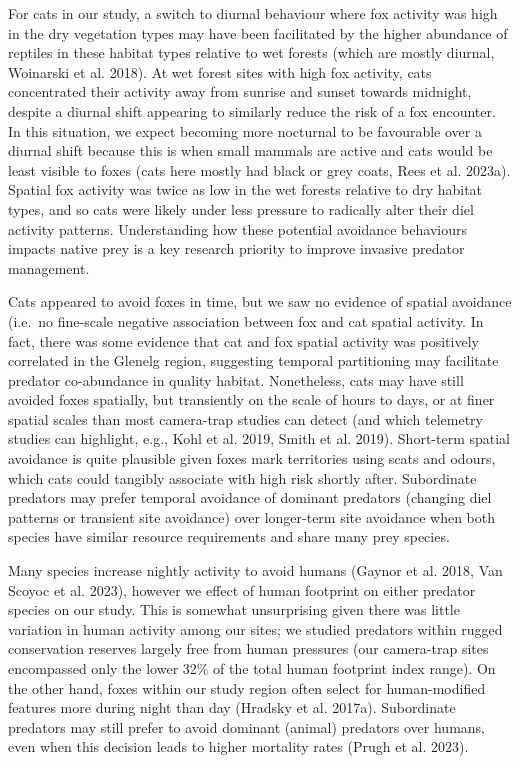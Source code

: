 \documentclass[preprint, 3p, authoryear]{elsarticle} %
\begin{document}
For cats in our study, a switch to diurnal behaviour where fox activity was high in the dry vegetation types may have been facilitated by the higher abundance of reptiles in these habitat types relative to wet forests (which are mostly diurnal, Woinarski et al. 2018). At wet forest sites with high fox activity, cats concentrated their activity away from sunrise and sunset towards midnight, despite a diurnal shift appearing to similarly reduce the risk of a fox encounter. In this situation, we expect becoming more nocturnal to be favourable over a diurnal shift because this is when small mammals are active and cats would be least visible to foxes (cats here mostly had black or grey coats, Rees et al. 2023a). Spatial fox activity was twice as low in the wet forests relative to dry habitat types, and so cats were likely under less pressure to radically alter their diel activity patterns. Understanding how these potential avoidance behaviours impacts native prey is a key research priority to improve invasive predator management.

Cats appeared to avoid foxes in time, but we saw no evidence of spatial avoidance (i.e.~no fine-scale negative association between fox and cat spatial activity. In fact, there was some evidence that cat and fox spatial activity was positively correlated in the Glenelg region, suggesting temporal partitioning may facilitate predator co-abundance in quality habitat. Nonetheless, cats may have still avoided foxes spatially, but transiently on the scale of hours to days, or at finer spatial scales than most camera-trap studies can detect (and which telemetry studies can highlight, e.g., Kohl et al. 2019, Smith et al. 2019). Short-term spatial avoidance is quite plausible given foxes mark territories using scats and odours, which cats could tangibly associate with high risk shortly after. Subordinate predators may prefer temporal avoidance of dominant predators (changing diel patterns or transient site avoidance) over longer-term site avoidance when both species have similar resource requirements and share many prey species.

Many species increase nightly activity to avoid humans (Gaynor et al. 2018, Van Scoyoc et al. 2023), however we effect of human footprint on either predator species on our study. This is somewhat unsurprising given there was little variation in human activity among our sites; we studied predators within rugged conservation reserves largely free from human pressures (our camera-trap sites encompassed only the lower 32\% of the total human footprint index range). On the other hand, foxes within our study region often select for human-modified features more during night than day (Hradsky et al. 2017a). Subordinate predators may still prefer to avoid dominant (animal) predators over humans, even when this decision leads to higher mortality rates (Prugh et al. 2023).
\end{document}
